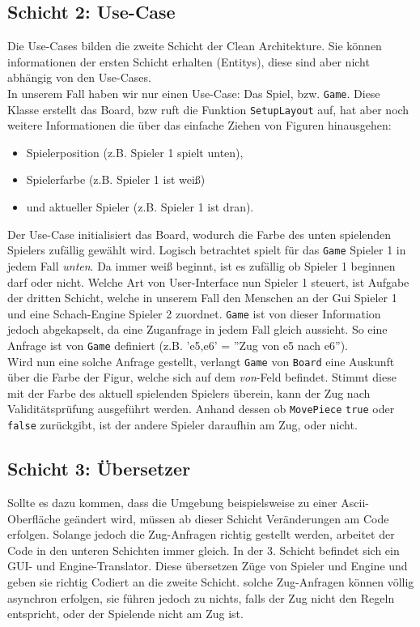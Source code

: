 \documentclass{article}
\begin{document}
\subsection{Schicht 2: Use-Case}
Die Use-Cases bilden die zweite Schicht der Clean Architekture. Sie können informationen der ersten Schicht erhalten (Entitys), diese sind aber nicht abhängig von den Use-Cases.\\
In unserem Fall haben wir nur einen Use-Case: Das Spiel, bzw. \texttt{Game}. Diese Klasse erstellt das Board, bzw ruft die Funktion \texttt{SetupLayout} auf, hat aber noch weitere Informationen die über das einfache Ziehen von Figuren hinausgehen:
\begin{center}
	\begin{itemize}
		\item Spielerposition (z.B. Spieler 1 spielt unten),
		\item Spielerfarbe (z.B. Spieler 1 ist weiß)
		\item und aktueller Spieler (z.B. Spieler 1 ist dran).
	\end{itemize}
\end{center}
Der Use-Case initialisiert das Board, wodurch die Farbe des unten spielenden Spielers zufällig gewählt wird. Logisch betrachtet spielt für das \texttt{Game} Spieler 1 in jedem Fall \textit{unten}. Da immer weiß beginnt, ist es zufällig ob Spieler 1 beginnen darf oder nicht. Welche Art von User-Interface nun Spieler 1 steuert, ist Aufgabe der dritten Schicht, welche in unserem Fall den Menschen an der Gui Spieler 1 und eine Schach-Engine Spieler 2 zuordnet. \texttt{Game} ist von dieser Information jedoch abgekapselt, da eine Zuganfrage in jedem Fall gleich aussieht.
So eine Anfrage ist von \texttt{Game} definiert (z.B. 'e5,e6' = ''Zug von e5 nach e6''). \\
Wird nun eine solche Anfrage gestellt, verlangt \texttt{Game} von \texttt{Board} eine Auskunft über die Farbe der Figur, welche sich auf dem \textit{von}-Feld befindet. Stimmt diese mit der Farbe des aktuell spielenden Spielers überein, kann der Zug nach Validitätsprüfung ausgeführt werden. Anhand dessen ob \texttt{MovePiece} \texttt{true} oder \texttt{false} zurückgibt, ist der andere Spieler daraufhin am Zug, oder nicht.
\subsection{Schicht 3: Übersetzer}
Sollte es dazu kommen, dass die Umgebung beispielsweise zu einer Ascii-Oberfläche geändert wird, müssen ab dieser Schicht Veränderungen am Code erfolgen. Solange jedoch die Zug-Anfragen richtig gestellt werden, arbeitet der Code in den unteren Schichten immer gleich. In der 3. Schicht befindet sich ein GUI- und Engine-Translator. Diese übersetzen Züge von Spieler und Engine und geben sie richtig Codiert an die zweite Schicht. solche Zug-Anfragen können völlig asynchron erfolgen, sie führen jedoch zu nichts, falls der Zug nicht den Regeln entspricht, oder der Spielende nicht am Zug ist.
\end{document}
